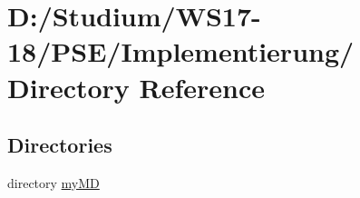 \hypertarget{dir_D_3A_2FStudium_2FWS17_2D18_2FPSE_2FImplementierung_2F}{
\section{D:/Studium/WS17-18/PSE/Implementierung/ Directory Reference}
\label{dir_D_3A_2FStudium_2FWS17_2D18_2FPSE_2FImplementierung_2F}
}


\subsection*{Directories}
\begin{CompactItemize}
\item 
directory \hyperlink{dir_D_3A_2FStudium_2FWS17_2D18_2FPSE_2FImplementierung_2FmyMD_2F}{my\-MD}
\end{CompactItemize}
